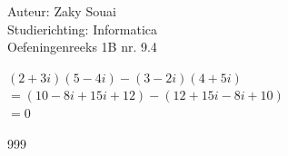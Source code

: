 \documentclass[a4paper]{article}
\begin{document}
  
\noindent \large Auteur: Zaky Souai \\
\noindent \large Studierichting: Informatica\\
\noindent \large Oefeningenreeks 1B nr. 9.4\\

\medskip

\normalsize

$(2+3i)(5-4i) - (3-2i)(4+5i) $ \\

$= (10-8i+15i+12) - (12+15i-8i+10)$ \\

$= 0$\\

\begin{thebibliography}{999}
\end{thebibliography}
\end{document}
